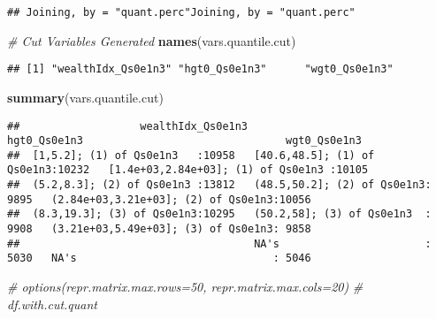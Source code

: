 \documentclass[
]{book}
\newenvironment{Shaded}{\begin{snugshade}}{\end{snugshade}}
\newcommand{\CommentTok}[1]{\textcolor[rgb]{0.56,0.35,0.01}{\textit{#1}}}
\newcommand{\KeywordTok}[1]{\textcolor[rgb]{0.13,0.29,0.53}{\textbf{#1}}}
\newcommand{\NormalTok}[1]{#1}
\newcommand{\OperatorTok}[1]{\textcolor[rgb]{0.81,0.36,0.00}{\textbf{#1}}}
\newcommand{\StringTok}[1]{\textcolor[rgb]{0.31,0.60,0.02}{#1}}
\begin{document}
\begin{verbatim}
## Joining, by = "quant.perc"Joining, by = "quant.perc"
\end{verbatim}

\begin{Shaded}
\end{Shaded}

\begin{Shaded}
\begin{Highlighting}[]
\CommentTok{# Cut Variables Generated}
\KeywordTok{names}\NormalTok{(vars.quantile.cut)}
\end{Highlighting}
\end{Shaded}

\begin{verbatim}
## [1] "wealthIdx_Qs0e1n3" "hgt0_Qs0e1n3"      "wgt0_Qs0e1n3"
\end{verbatim}

\begin{Shaded}
\begin{Highlighting}[]
\KeywordTok{summary}\NormalTok{(vars.quantile.cut)}
\end{Highlighting}
\end{Shaded}

\begin{verbatim}
##                   wealthIdx_Qs0e1n3                      hgt0_Qs0e1n3                                wgt0_Qs0e1n3  
##  [1,5.2]; (1) of Qs0e1n3   :10958   [40.6,48.5]; (1) of Qs0e1n3:10232   [1.4e+03,2.84e+03]; (1) of Qs0e1n3 :10105  
##  (5.2,8.3]; (2) of Qs0e1n3 :13812   (48.5,50.2]; (2) of Qs0e1n3: 9895   (2.84e+03,3.21e+03]; (2) of Qs0e1n3:10056  
##  (8.3,19.3]; (3) of Qs0e1n3:10295   (50.2,58]; (3) of Qs0e1n3  : 9908   (3.21e+03,5.49e+03]; (3) of Qs0e1n3: 9858  
##                                     NA's                       : 5030   NA's                               : 5046
\end{verbatim}

\begin{Shaded}
\begin{Highlighting}[]
\CommentTok{# options(repr.matrix.max.rows=50, repr.matrix.max.cols=20)}
\CommentTok{# df.with.cut.quant}
\end{Highlighting}
\end{Shaded}
\end{document}
